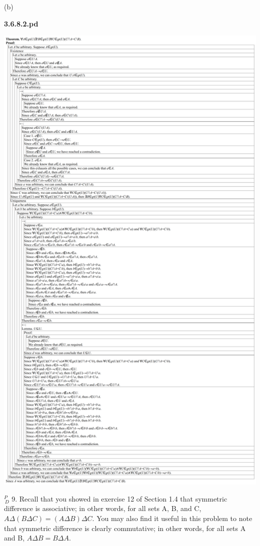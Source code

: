 \documentclass{article}
\begin{document}
\vspace{30pt}

(b)

\textbf{3.6.8.2.pd}
\vspace{10pt}

\includegraphics[width=\textwidth,height=\textheight,keepaspectratio]{3_6_8_2}

\vspace{30pt}

$^{\textit{P}}_{\, \textit{D}}$ 9. Recall that you showed in exercise 12 of Section 1.4 that symmetric
difference is associative; in other words, for all sets A, B, and C,
$A \Delta (B \Delta C) = (A \Delta B) \Delta C$. You may also find it useful in this problem
to note that symmetric difference is clearly commutative; in other
words, for all sets A and B, $A \Delta B = B \Delta A$.
\end{document}
